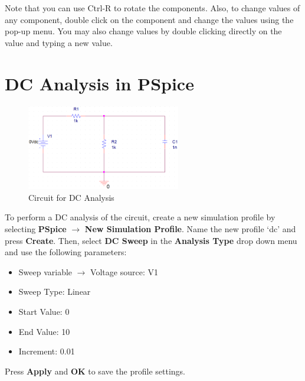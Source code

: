\documentclass[12pt]{../manual}
\begin{document}
Note that you can use Ctrl-R to rotate the components. Also, to change values of any component, double click on the component and change the values using the pop-up menu. You may also change values by double clicking directly on the value and typing a new value.
%
\newpage
\section{DC Analysis in PSpice}
\begin{figure}[ht!]
	\begin{center}
		\includegraphics[width=0.6\textwidth]{figures/DCAnalysisCircuitCrop.PNG}
	\end{center}
	\caption{Circuit for DC Analysis}
	\label{fig:dc}
\end{figure}

To perform a DC analysis of the circuit, create a new simulation profile by selecting \textbf{PSpice} $\to$ \textbf{New Simulation Profile}. Name the new profile `dc' and press \textbf{Create}. Then,  select \textbf{DC Sweep} in the \textbf{Analysis Type} drop down menu and use the following parameters:
\begin{itemize}
\item Sweep variable $\to$ Voltage source: V1
\item Sweep Type: Linear
\item Start Value: 0
\item End Value: 10
\item Increment: 0.01
\end{itemize}

Press \textbf{Apply} and \textbf{OK} to save the profile settings. 

\end{document}
